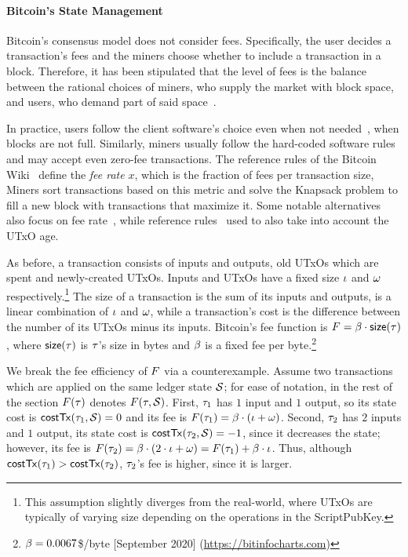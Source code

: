 \paragraph{Bitcoin's State Management}\label{sec:bitcoin-fees}
Bitcoin's consensus model does not consider fees. Specifically, the user
decides a transaction's fees and the miners choose whether to include a
transaction in a block. Therefore, it has been stipulated that the level of
fees is the balance between the rational choices of miners, who supply the
market with block space, and users, who demand part of said
space~\cite{bitcoin-fees}.

In practice, users follow the client software's choice even when not
needed~\cite{FCW:MosBoh15}, \eg when blocks are not full. Similarly, miners
usually follow the hard-coded software rules and may accept even zero-fee
transactions. The reference rules of the Bitcoin Wiki~\cite{bitcoin-fees}
define the \emph{fee rate} $x$, which is the fraction of fees per transaction
size, Miners sort transactions based on this metric and solve the Knapsack
problem to fill a new block with transactions that maximize it. Some notable
alternatives also focus on fee
rate~\cite{santos2019miner,rizun2015transaction}, while reference
rules~\cite{bitcoin-fees} used to also take into account the UTxO age.

As before, a transaction consists of inputs and outputs, \ie old UTxOs which
are spent and newly-created UTxOs. Inputs and UTxOs have a fixed size
$\iota$ and $\omega$ respectively.\footnote{This assumption slightly
diverges from the real-world, where UTxOs are typically of varying size
depending on the operations in the ScriptPubKey.} The size of a transaction is
the sum of its inputs and outputs, \ie is a linear combination of
$\iota$ and $\omega$, while a transaction's cost is the difference
between the number of its UTxOs minus its inputs.
Bitcoin's fee function is $F = \beta \cdot
\mathsf{size}(\tau)$, where $\mathsf{size}(\tau)$ is $\tau$'s size in bytes and
$\beta$ is a fixed fee per byte.\footnote{$\beta = 0.0067$\$/byte
[September 2020] (\url{https://bitinfocharts.com})}

We break the fee efficiency of $F$ via a counterexample. Assume two
transactions which are applied on the same ledger state $\mathcal{S}$; for
ease of notation, in the rest of the section $F(\tau)$ denotes
$F(\tau, \mathcal{S})$. First, $\tau_1$ has $1$ input and $1$ output,
so its state cost is $\mathsf{costTx}(\tau_1, \mathcal{S}) = 0$ and its fee is
$F(\tau_1) = \beta \cdot (\iota + \omega)$. Second,
$\tau_2$ has $2$ inputs and $1$ output, \ie its state cost is $\mathsf{costTx}(\tau_2,
\mathcal{S}) = -1$, since it decreases the state; however, its fee is
$F(\tau_2) = \beta \cdot (2 \cdot \iota + \omega) =
F(\tau_1) + \beta \cdot \iota$.  Thus, although
$\mathsf{costTx}(\tau_1) > \mathsf{costTx}(\tau_2)$, $\tau_2$'s fee is higher, since it is
larger.

